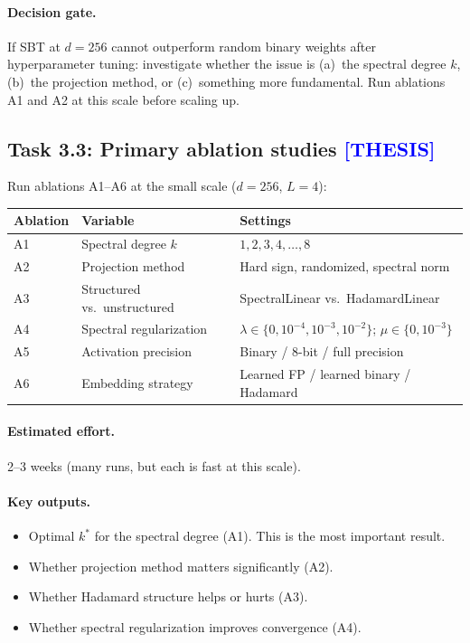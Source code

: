 \documentclass[12pt,a4paper]{article}
\newcommand{\thesis}{\texorpdfstring{\textcolor{blue}{\textbf{[THESIS]}}}{[THESIS]}}
\begin{document}
\paragraph{Decision gate.} If SBT at $d = 256$ cannot outperform random binary weights after hyperparameter tuning: investigate whether the issue is (a)~the spectral degree $k$, (b)~the projection method, or (c)~something more fundamental. Run ablations A1 and A2 at this scale before scaling up.


\subsection{Task 3.3: Primary ablation studies \thesis}

Run ablations A1--A6 at the small scale ($d = 256$, $L = 4$):

\begin{center}
\begin{tabular}{lll}
\toprule
\textbf{Ablation} & \textbf{Variable} & \textbf{Settings} \\
\midrule
A1 & Spectral degree $k$ & $1, 2, 3, 4, \ldots, 8$ \\
A2 & Projection method & Hard sign, randomized, spectral norm \\
A3 & Structured vs.\ unstructured & SpectralLinear vs.\ HadamardLinear \\
A4 & Spectral regularization & $\lambda \in \{0, 10^{-4}, 10^{-3}, 10^{-2}\}$; $\mu \in \{0, 10^{-3}\}$ \\
A5 & Activation precision & Binary / 8-bit / full precision \\
A6 & Embedding strategy & Learned FP / learned binary / Hadamard \\
\bottomrule
\end{tabular}
\end{center}

\paragraph{Estimated effort.} 2--3 weeks (many runs, but each is fast at this scale).

\paragraph{Key outputs.}
\begin{itemize}
    \item Optimal $k^*$ for the spectral degree (A1). This is the most important result.
    \item Whether projection method matters significantly (A2).
    \item Whether Hadamard structure helps or hurts (A3).
    \item Whether spectral regularization improves convergence (A4).
\end{itemize}
\end{document}
